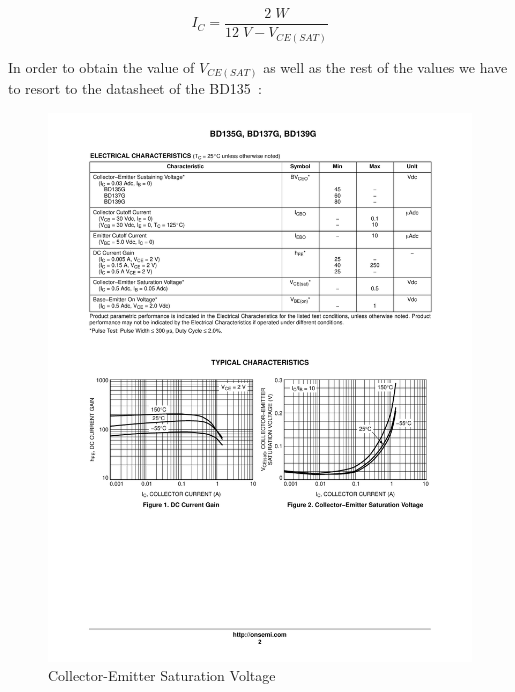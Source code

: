\begin{equation*}
    I_C = \frac{2 \; W}{12 \; V - V_{CE(SAT)}}
\end{equation*}

\clearpage

In order to obtain the value of $V_{CE(SAT)}$ as well as the rest of the values we have to resort to the datasheet of the BD135~\autocite{BD135}:

\begin{figure}[H]
    \centering
    \includegraphics[]{Graphics/Practice 8/BJT/DATASHEET/VCE-IC.pdf}
    \caption{Collector-Emitter Saturation Voltage~\autocite{BD135}}
    \label{fig:VCE_SAT}
\end{figure}


